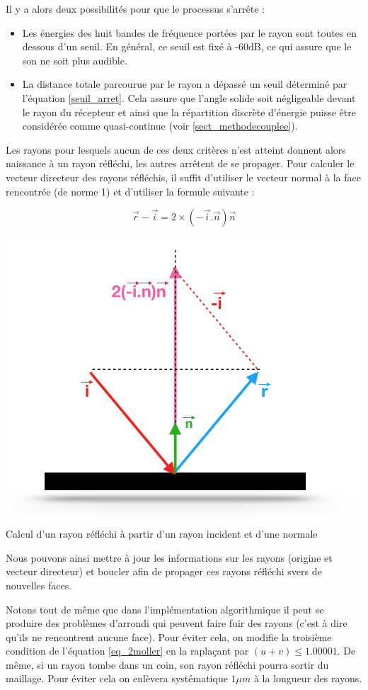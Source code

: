 Il y a alors deux possibilités pour que le processus s'arrête : 
\begin{itemize}
	\item Les énergies des huit bandes de fréquence portées par le rayon sont toutes en dessous d'un seuil. En général, ce seuil est fixé à -60dB, ce qui assure que le son ne soit plus audible.
	\item La distance totale parcourue par le rayon a dépassé un seuil déterminé par l'équation \ref{seuil_arret}. Cela assure que l'angle solide soit négligeable devant le rayon du récepteur et ainsi que la répartition discrète d'énergie puisse être considérée comme quasi-continue (voir \ref{sect_methodecouplee}).
\end{itemize}

Les rayons pour lesquels aucun de ces deux critères n'est atteint donnent alors naissance à un rayon réfléchi, les autres arrêtent de se propager. Pour calculer le vecteur directeur des rayons réfléchis, il suffit d'utiliser le vecteur normal à la face rencontrée (de norme 1) et d'utiliser la formule suivante :

\begin{equation}
\overrightarrow{r} - \overrightarrow{i} = 2 \times (-\overrightarrow{i}.\overrightarrow{n})\overrightarrow{n}
\end{equation}

\begin{figureth}
	\includegraphics[width=0.6\linewidth]{images/rayRefl}
	\caption{Calcul d'un rayon réfléchi à partir d'un rayon incident et d'une normale}
	\label{rayRefl}
\end{figureth}

Nous pouvons ainsi mettre à jour les informations sur les rayons (origine et vecteur directeur) et boucler afin de propager ces rayons réfléchi svers de nouvelles faces.

Notons tout de même que dans l'implémentation algorithmique il peut se produire des problèmes d'arrondi qui peuvent faire fuir des rayons (c'est à dire qu'ils ne rencontrent aucune face). Pour éviter cela, on modifie la troisième condition de l'équation \ref{eq_2moller} en la raplaçant par $(u+v)\leqslant1.00001$. De même, si un rayon tombe dans un coin, son rayon réfléchi pourra sortir du maillage. Pour éviter cela on enlèvera systématique $1\mu m$ à la longueur des rayons.

